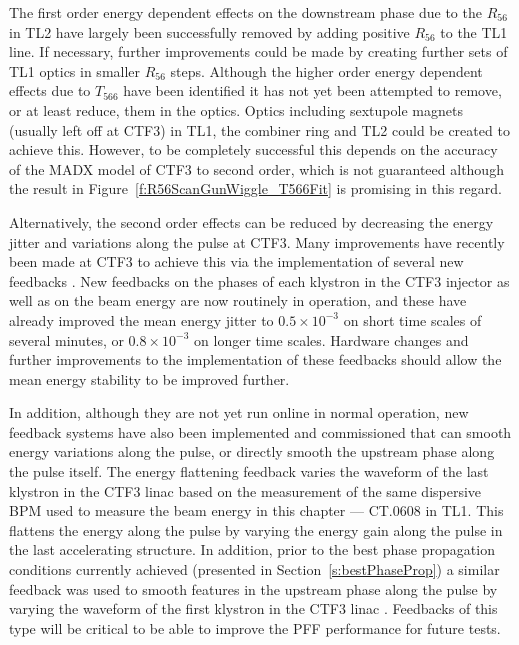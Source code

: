 The first order energy dependent effects on the downstream phase due to the \(R_{56}\) in TL2 have largely been successfully removed by adding positive \(R_{56}\) to the TL1 line. If necessary, further improvements could be made by creating further sets of TL1 optics in smaller \(R_{56}\) steps. 
Although the higher order energy dependent effects due to \(T_{566}\) have been identified it has not yet been attempted to remove, or at least reduce, them in the optics. Optics including sextupole magnets (usually left off at CTF3) in TL1, the combiner ring and TL2 could be created to achieve this. However, to be completely successful this depends on the accuracy of the MADX model of CTF3 to second order, which is not guaranteed although the result in Figure~\ref{f:R56ScanGunWiggle_T566Fit} is promising in this regard.

Alternatively, the second order effects can be reduced by decreasing the energy jitter and variations along the pulse at CTF3. Many improvements have recently been made at CTF3 to achieve this via the implementation of several new feedbacks \cite{lukasIPAC16}. New feedbacks on the phases of each klystron in the CTF3 injector as well as on the beam energy are now routinely in operation, and these have already improved the mean energy jitter to \(0.5\times10^{-3}\) on short time scales of several minutes, or \(0.8\times10^{-3}\) on longer time scales. Hardware changes and further improvements to the implementation of these feedbacks should allow the mean energy stability to be improved further.

In addition, although they are not yet run online in normal operation, new feedback systems have also been implemented and commissioned that can smooth energy variations along the pulse, or directly smooth the upstream phase along the pulse itself. The energy flattening feedback \cite{tobiasPriv} varies the waveform of the last klystron in the CTF3 linac based on the measurement of the same dispersive BPM used to measure the beam energy in this chapter --- CT.0608 in TL1. This flattens the energy along the pulse by varying the energy gain along the pulse in the last accelerating structure. In addition, prior to the best phase propagation conditions currently achieved (presented in Section~\ref{s:bestPhaseProp}) a similar feedback was used to smooth features in the upstream phase along the pulse by varying the waveform of the first klystron in the CTF3 linac \cite{davideThesis}.
 Feedbacks of this type will be critical to be able to improve the PFF performance for future tests.

